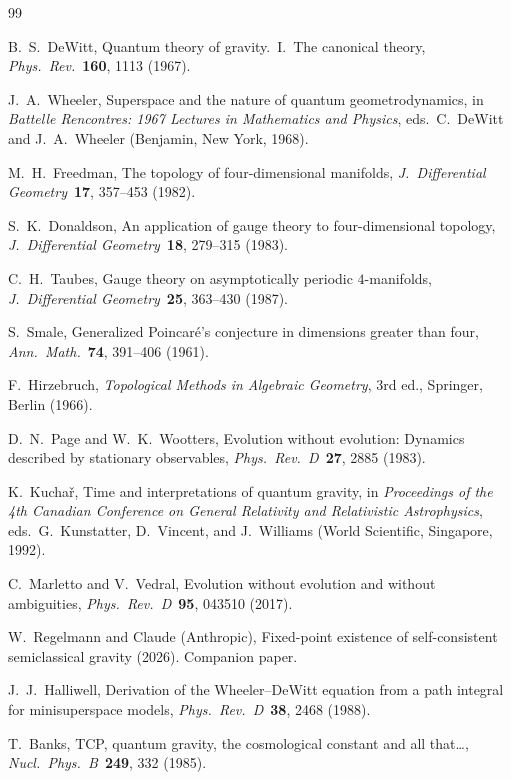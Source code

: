 \documentclass[12pt,a4paper]{article}
\theoremstyle{definition}
\theoremstyle{remark}
\begin{document}
\begin{thebibliography}{99}

 B.~S.~DeWitt, Quantum theory of gravity.~I.~The canonical
theory, \textit{Phys.\ Rev.}\ \textbf{160}, 1113 (1967).

 J.~A.~Wheeler, Superspace and the nature of quantum
geometrodynamics, in \textit{Battelle Rencontres: 1967 Lectures in
Mathematics and Physics}, eds.\ C.~DeWitt and J.~A.~Wheeler (Benjamin,
New York, 1968).

 M.~H.~Freedman, The topology of four-dimensional manifolds,
\textit{J.\ Differential Geometry}\ \textbf{17}, 357--453 (1982).

 S.~K.~Donaldson, An application of gauge theory to
four-dimensional topology, \textit{J.\ Differential Geometry}\ \textbf{18},
279--315 (1983).

 C.~H.~Taubes, Gauge theory on asymptotically periodic
$4$-manifolds, \textit{J.\ Differential Geometry}\ \textbf{25}, 363--430 (1987).

 S.~Smale, Generalized Poincar\'e's conjecture in dimensions
greater than four, \textit{Ann.\ Math.}\ \textbf{74}, 391--406 (1961).

 F.~Hirzebruch, \textit{Topological Methods in Algebraic
Geometry}, 3rd ed., Springer, Berlin (1966).

 D.~N.~Page and W.~K.~Wootters, Evolution without
evolution: Dynamics described by stationary observables,
\textit{Phys.\ Rev.\ D}\ \textbf{27}, 2885 (1983).

 K.~Kucha\v{r}, Time and interpretations of quantum
gravity, in \textit{Proceedings of the 4th Canadian Conference on General
Relativity and Relativistic Astrophysics}, eds.\ G.~Kunstatter,
D.~Vincent, and J.~Williams (World Scientific, Singapore, 1992).

 C.~Marletto and V.~Vedral, Evolution without
evolution and without ambiguities, \textit{Phys.\ Rev.\ D}\ \textbf{95},
043510 (2017).

 W.~Regelmann and Claude (Anthropic), Fixed-point
existence of self-consistent semiclassical gravity (2026). Companion paper.

 J.~J.~Halliwell, Derivation of the Wheeler--DeWitt
equation from a path integral for minisuperspace models,
\textit{Phys.\ Rev.\ D}\ \textbf{38}, 2468 (1988).

 T.~Banks, TCP, quantum gravity, the cosmological constant
and all that\ldots, \textit{Nucl.\ Phys.\ B}\ \textbf{249}, 332 (1985).

\end{thebibliography}
\end{document}
